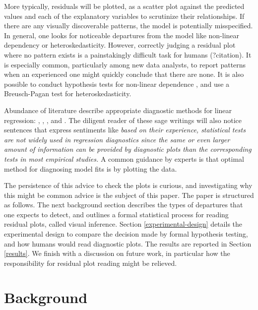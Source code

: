 \documentclass[]{interact}
\theoremstyle{plain}%
\theoremstyle{definition}
\theoremstyle{remark}
\begin{document}
More typically, residuals will be plotted, as a scatter plot against the
predicted values and each of the explanatory variables to scrutinize
their relationships. If there are any visually discoverable patterns,
the model is potentially misspecified. In general, one looks for
noticeable departures from the model like non-linear dependency or
heteroskedasticity. However, correctly judging a residual plot where no
pattern exists is a painstakingly difficult task for humans (?citation).
It is especially common, particularly among new data analysts, to report
patterns when an experienced one might quickly conclude that there are
none. It is also possible to conduct hypothesis tests for non-linear
dependence \citep{ramsey_tests_1969}, and use a Breusch-Pagan test
\citep{breusch_simple_1979} for heteroskedasticity.

Abundance of literature describe appropriate diagnostic methods for
linear regression: \citet{draper1998applied},
\citet{montgomery1982introduction}, \citet{belsley_regression_1980},
\citet{cook_applied_1999} and \citet{cook1982residuals}. The diligent
reader of these sage writings will also notice sentences that express
sentiments like \emph{based on their experience, statistical tests are
not widely used in regression diagnostics since the same or even larger
amount of information can be provided by diagnostic plots than the
corresponding tests in most empirical studies.} A common guidance by
experts is that optimal method for diagnosing model fits is by plotting
the data.

The persistence of this advice to check the plots is curious, and
investigating why this might be common advice is the subject of this
paper. The paper is structured as follows. The next background section
describes the types of departures that one expects to detect, and
outlines a formal statistical process for reading residual plots, called
visual inference. Section \ref{experimental-design} details the
experimental design to compare the decision made by formal hypothesis
testing, and how humans would read diagnostic plots. The results are
reported in Section \ref{results}. We finish with a discussion on future
work, in particular how the responsibility for residual plot reading
might be relieved.

\hypertarget{background}{%
\section{Background}\label{background}}
\end{document}
